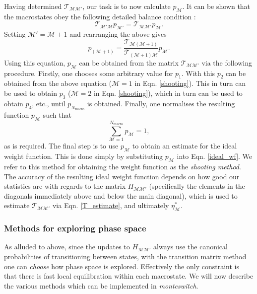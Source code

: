 \documentclass{report}
\begin{document}
Having determined  $\mathcal{T}_{\mathcal{MM}'}$, our task is to now calculate $p_{\mathcal{M}}$. It can be shown that the macrostates obey the following
detailed balance condition \cite{Smith_1995}:
\begin{equation}
\mathcal{T}_{\mathcal{M}'\mathcal{M}}p_{\mathcal{M}'}=\mathcal{T}_{\mathcal{MM}'}p_{\mathcal{M}}.
\end{equation}
Setting $\mathcal{M}'=\mathcal{M}+1$ and rearranging the above gives
\begin{equation}\label{shooting}
p_{(\mathcal{M}+1)}=\frac{\mathcal{T}_{\mathcal{M}(\mathcal{M}+1)}}{\mathcal{T}_{(\mathcal{M}+1)\mathcal{M}}}p_{\mathcal{M}}.
\end{equation}
Using this equation, $p_{\mathcal{M}}$ can be obtained from the matrix $\mathcal{T}_{\mathcal{M}\mathcal{M}'}$ via the following procedure.
Firstly, one chooses some arbitrary value for $p_1$. With this $p_2$ can be obtained from the above equation ($\mathcal{M}=1$ in Eqn. \eqref{shooting}). 
This in turn can be used to obtain $p_3$ ($\mathcal{M}=2$ in Eqn. \eqref{shooting}), which in turn can be used to obtain $p_4$, etc., until
$p_{N_{\text{macro}}}$ is obtained. Finally, one normalises the resulting function $p_{\mathcal{M}}$ such that
\begin{equation}
\sum_{\mathcal{M}=1}^{N_{\text{macro}}}p_{\mathcal{M}}=1,
\end{equation}
as is required. The final step is to use $p_{\mathcal{M}}$ to obtain an estimate for the ideal weight function. This is done simply by substituting 
$p_{\mathcal{M}}$ into Eqn. \eqref{ideal_wf}. We refer to this method for obtaining the weight function as the \emph{shooting method}.
The accuracy of the resulting ideal weight function depends on how good our statistics are with regards to
the matrix $H_{\mathcal{M}\mathcal{M}'}$ (specifically the elements in the diagonals immediately above and below the main diagonal), which is used to
estimate $\mathcal{T}_{\mathcal{M}\mathcal{M}'}$ via Eqn. \eqref{T_estimate}, and ultimately $\eta^*_{\mathcal{M}}$. 


\subsubsection{Methods for exploring phase space}
As alluded to above, since the updates to $H_{\mathcal{M}\mathcal{M}'}$ always use the canonical probabilities of transitioning between states, 
with the transition matrix method one can \emph{choose} how phase space is explored. Effectively the only constraint is that there is fast local 
equilibration within each macrostate. We will now describe the various methods which can be implemented in \emph{monteswitch}.
\end{document}
